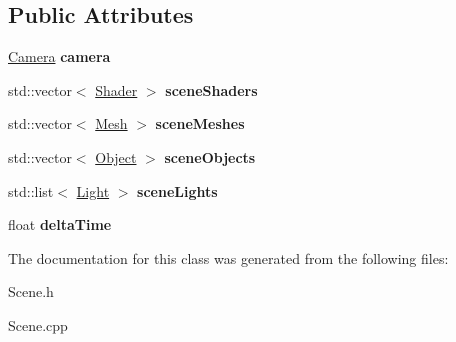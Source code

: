 \subsection*{Public Attributes}
\begin{DoxyCompactItemize}
\item 
\hypertarget{class_scene_afed13ec4ba2d7ab75b273d507911b498}{}\hyperlink{class_camera}{Camera} {\bfseries camera}\label{class_scene_afed13ec4ba2d7ab75b273d507911b498}

\item 
\hypertarget{class_scene_a5f692c13f2db4299793ffc4d36c7e2ba}{}std\+::vector$<$ \hyperlink{class_shader}{Shader} $>$ {\bfseries scene\+Shaders}\label{class_scene_a5f692c13f2db4299793ffc4d36c7e2ba}

\item 
\hypertarget{class_scene_a7be2dbccfae00f70b1d07b2c4d738ece}{}std\+::vector$<$ \hyperlink{class_mesh}{Mesh} $>$ {\bfseries scene\+Meshes}\label{class_scene_a7be2dbccfae00f70b1d07b2c4d738ece}

\item 
\hypertarget{class_scene_ad9e4d19ec059a134617ee31d1df03714}{}std\+::vector$<$ \hyperlink{class_object}{Object} $>$ {\bfseries scene\+Objects}\label{class_scene_ad9e4d19ec059a134617ee31d1df03714}

\item 
\hypertarget{class_scene_aa98be8079c5bed3a6a24aa55fe15f3f0}{}std\+::list$<$ \hyperlink{class_light}{Light} $>$ {\bfseries scene\+Lights}\label{class_scene_aa98be8079c5bed3a6a24aa55fe15f3f0}

\item 
\hypertarget{class_scene_a4624158c6d315465401ccdda659bc13b}{}float {\bfseries delta\+Time}\label{class_scene_a4624158c6d315465401ccdda659bc13b}

\end{DoxyCompactItemize}


The documentation for this class was generated from the following files\+:\begin{DoxyCompactItemize}
\item 
Scene.\+h\item 
Scene.\+cpp\end{DoxyCompactItemize}
